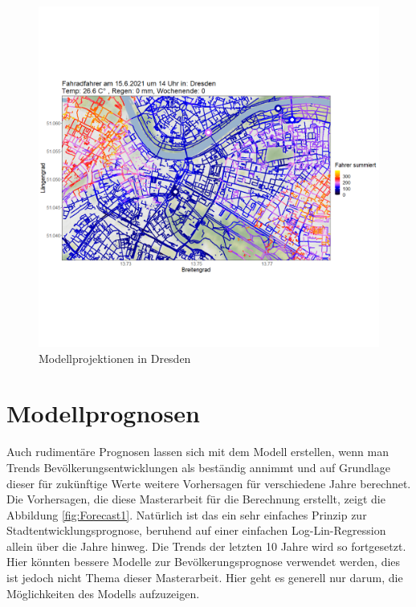 \documentclass[a4paper,12pt]{thesis}
\begin{document}
\begin{figure}[!ht]
	\centering
	\includegraphics[width=\textwidth]{Plots/Dresden.png}
	\caption{Modellprojektionen in Dresden}
	\label{Dresden}
\end{figure}

\section{Modellprognosen}

Auch rudimentäre Prognosen lassen sich mit dem Modell erstellen, wenn man Trends Bevölkerungsentwicklungen als beständig annimmt und auf Grundlage dieser für zukünftige Werte weitere Vorhersagen für verschiedene Jahre berechnet. Die Vorhersagen, die diese Masterarbeit für die Berechnung erstellt, zeigt die Abbildung \ref{fig:Forecast1}. Natürlich ist das ein sehr einfaches Prinzip zur Stadtentwicklungsprognose, beruhend auf einer einfachen Log-Lin-Regression allein über die Jahre hinweg. Die Trends der letzten 10 Jahre wird so fortgesetzt. Hier könnten bessere Modelle zur Bevölkerungsprognose verwendet werden, dies ist jedoch nicht Thema dieser Masterarbeit. Hier geht es generell nur darum, die Möglichkeiten des Modells aufzuzeigen.
\end{document}
